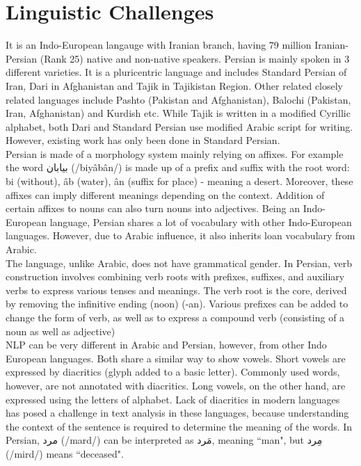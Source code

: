 \documentclass{article}
\begin{document}
\section{Linguistic Challenges}
It is an Indo-European langauge with Iranian branch, having 79 million Iranian-Persian (Rank 25) native and non-native speakers. \cite{wikitotalspeakers} 
Persian is mainly spoken in 3 different varieties. It is a pluricentric language and includes Standard Persian of Iran, Dari in Afghanistan and Tajik in Tajikistan Region. Other related closely related languages include Pashto (Pakistan and Afghanistan), Balochi (Pakistan, Iran, Afghanistan) and Kurdish etc.
While Tajik is written in a modified Cyrillic alphabet, both Dari and Standard Persian use modified Arabic script for writing. However, existing work has only been done in Standard Persian. \\
Persian is made of a morphology system mainly relying on affixes. For example the word \textfarsi{بیابان} (/biyâbân/) is made up of a prefix and suffix with the root word: bi (without), âb (water), ân (suffix for place) - meaning a desert. Moreover, these affixes can imply different meanings depending on the context. Addition of certain affixes to nouns can also turn nouns into adjectives. Being an Indo-European language, Persian shares a lot of vocabulary with other Indo-European languages. However, due to Arabic influence, it also inherits loan vocabulary from Arabic. \\
The language, unlike Arabic, does not have grammatical gender.
In Persian, verb construction involves combining verb roots with prefixes, suffixes, and auxiliary verbs to express various tenses and meanings. The verb root is the core, derived by removing the infinitive ending (noon) (-an). Various prefixes can be added to change the form of verb, as well as to express a compound verb (consisting of a noun as well as adjective)
\\
NLP can be very different in Arabic and Persian, however, from other Indo European languages. Both share a similar way to show vowels. Short vowels are expressed by diacritics (glyph added to a basic letter). Commonly used words, however, are not annotated with diacritics. Long vowels, on the other hand, are expressed using the letters of alphabet. Lack of diacritics in modern languages has posed a challenge in text analysis in these languages, because understanding the context of the sentence is required to determine the meaning of the words. In Persian, \textfarsi{مرد} (/mard/) can be interpreted as \textfarsi{مَرد}, meaning
``man", but \textfarsi{مِرد} (/mird/) means ``deceased".
\end{document}
